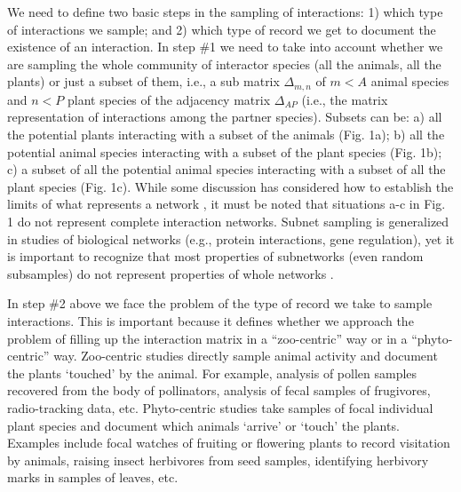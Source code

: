 \documentclass[12pt]{article}
\begin{document}
We need to define two basic steps in the sampling of interactions: 1) which type of interactions we sample; and 2) which type of record we get to document the existence of an interaction. In step \#1 we need to take into account whether we are sampling the whole community of interactor species (all the animals, all the plants) or just a subset of them, i.e., a sub matrix $\Delta_{m,n}$ of $m < A$ animal species and $n <  P$ plant species of the adjacency matrix $\Delta_{AP}$ (i.e., the matrix representation of interactions among the partner species). Subsets can be: a) all the potential plants interacting with a subset of the animals (Fig. 1a); b) all the potential animal species interacting with a subset of the plant species (Fig. 1b); c) a subset of all the potential animal species interacting with a subset of all the plant species (Fig. 1c). While some discussion has considered how to establish the limits of what represents a network \citep{Strogatz:2001wc} \citep[in analogy to discussion on food-web limits;][]{Cohen:1978}, it must be noted that situations a-c in Fig. 1 do not represent complete interaction networks. Subnet sampling is generalized in studies of biological networks (e.g., protein interactions, gene regulation), yet it is important to recognize that most properties of subnetworks (even random subsamples) do not represent properties of whole networks \citep{Stumpf:2005tn}. 


In step \#2 above we face the problem of the type of record we take to sample interactions. This is important because it defines whether we approach the problem of filling up the interaction matrix in a ``zoo-centric'' way or in a ``phyto-centric'' way. Zoo-centric studies directly sample animal activity and document the plants `touched' by the animal. For example, analysis of pollen samples recovered from the body of pollinators, analysis of fecal samples of frugivores, radio-tracking data, etc. Phyto-centric studies take samples of focal individual plant species and document which animals `arrive' or `touch' the plants. Examples include focal watches of fruiting or flowering plants to record visitation by animals, raising insect herbivores from seed samples, identifying herbivory marks in samples of leaves, etc. 
\end{document}
